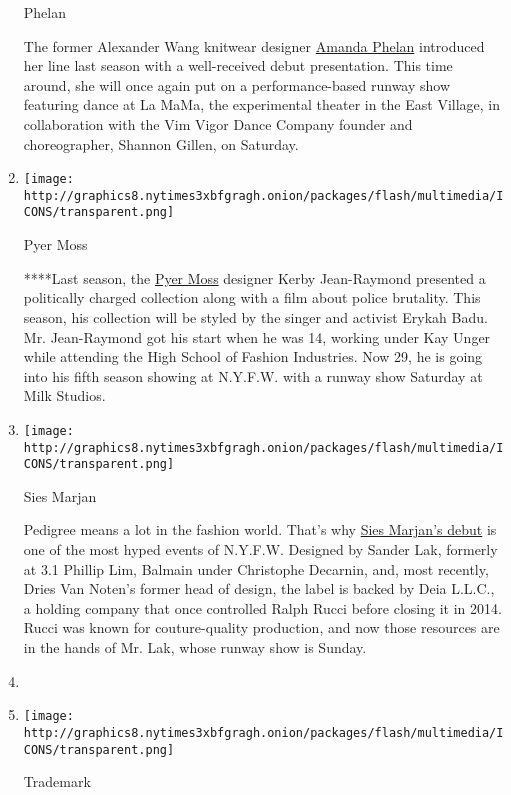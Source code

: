 \begin{enumerate}
  Phelan

  The former Alexander Wang knitwear designer
  \href{http://www.vogue.com/fashion-shows/spring-2016-ready-to-wear/phelan}{Amanda
  Phelan} introduced her line last season with a well-received debut
  presentation. This time around, she will once again put on a
  performance-based runway show featuring dance at La MaMa, the
  experimental theater in the East Village, in collaboration with the
  Vim Vigor Dance Company founder and choreographer, Shannon Gillen, on
  Saturday. 
\item
  \texttt{[image: http://graphics8.nytimes3xbfgragh.onion/packages/flash/multimedia/ICONS/transparent.png]}

  Pyer Moss

  ****Last season, the \href{https://pyermoss.com}{Pyer Moss} designer
  Kerby Jean-Raymond presented a politically charged collection along
  with a film about police brutality. This season, his collection will
  be styled by the singer and activist Erykah Badu. Mr. Jean-Raymond got
  his start when he was 14, working under Kay Unger while attending the
  High School of Fashion Industries. Now 29, he is going into his fifth
  season showing at N.Y.F.W. with a runway show Saturday at Milk
  Studios.
\item
  \texttt{[image: http://graphics8.nytimes3xbfgragh.onion/packages/flash/multimedia/ICONS/transparent.png]}

  Sies Marjan

  Pedigree means a lot in the fashion world. That's why
  \href{http://www.topfash.org/luxury/Fashion/arnault-biver-unveil-tag-heuer-connected-watch.a/sies-marjan-the-new-collection-by-dries-van-noten-s-former-head-of-design.html}{Sies
  Marjan's debut} is one of the most hyped events of N.Y.F.W. Designed
  by Sander Lak, formerly at 3.1 Phillip Lim, Balmain under Christophe
  Decarnin, and, most recently, Dries Van Noten's former head of design,
  the label is backed by Deia L.L.C., a holding company that once
  controlled Ralph Rucci before closing it in 2014. Rucci was known for
  couture-quality production, and now those resources are in the hands
  of Mr. Lak, whose runway show is Sunday. 
\item
\item
  \texttt{[image: http://graphics8.nytimes3xbfgragh.onion/packages/flash/multimedia/ICONS/transparent.png]}

  Trademark


\end{enumerate}
